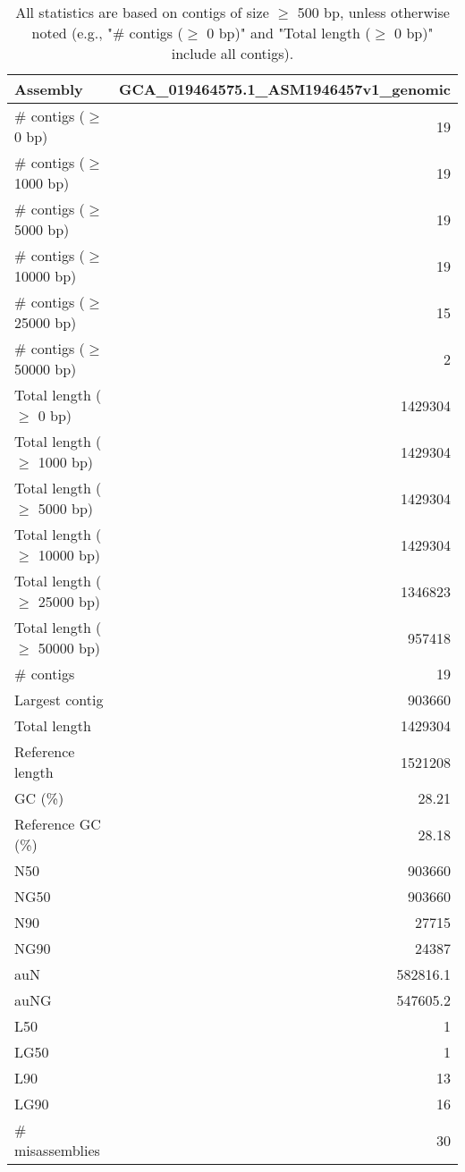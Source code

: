 \documentclass[12pt,a4paper]{article}
\begin{document}
\begin{table}[ht]
\begin{center}
\caption{All statistics are based on contigs of size $\geq$ 500 bp, unless otherwise noted (e.g., "\# contigs ($\geq$ 0 bp)" and "Total length ($\geq$ 0 bp)" include all contigs).}
\begin{tabular}{|l*{1}{|r}|}
\hline
Assembly & GCA\_019464575.1\_ASM1946457v1\_genomic \\ \hline
\# contigs ($\geq$ 0 bp) & 19 \\ \hline
\# contigs ($\geq$ 1000 bp) & 19 \\ \hline
\# contigs ($\geq$ 5000 bp) & 19 \\ \hline
\# contigs ($\geq$ 10000 bp) & 19 \\ \hline
\# contigs ($\geq$ 25000 bp) & 15 \\ \hline
\# contigs ($\geq$ 50000 bp) & 2 \\ \hline
Total length ($\geq$ 0 bp) & 1429304 \\ \hline
Total length ($\geq$ 1000 bp) & 1429304 \\ \hline
Total length ($\geq$ 5000 bp) & 1429304 \\ \hline
Total length ($\geq$ 10000 bp) & 1429304 \\ \hline
Total length ($\geq$ 25000 bp) & 1346823 \\ \hline
Total length ($\geq$ 50000 bp) & 957418 \\ \hline
\# contigs & 19 \\ \hline
Largest contig & 903660 \\ \hline
Total length & 1429304 \\ \hline
Reference length & 1521208 \\ \hline
GC (\%) & 28.21 \\ \hline
Reference GC (\%) & 28.18 \\ \hline
N50 & 903660 \\ \hline
NG50 & 903660 \\ \hline
N90 & 27715 \\ \hline
NG90 & 24387 \\ \hline
auN & 582816.1 \\ \hline
auNG & 547605.2 \\ \hline
L50 & 1 \\ \hline
LG50 & 1 \\ \hline
L90 & 13 \\ \hline
LG90 & 16 \\ \hline
\# misassemblies & 30 \\ \hline

\end{tabular}
\end{center}
\end{table}
\end{document}
